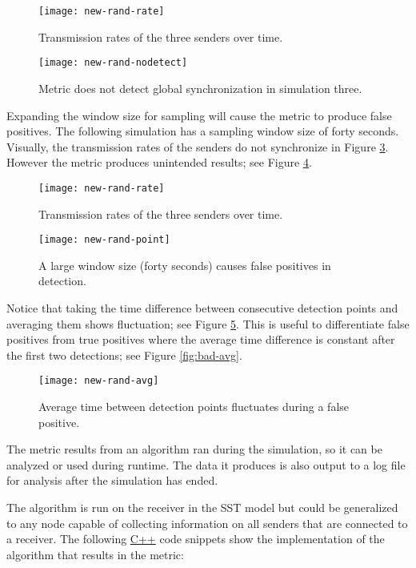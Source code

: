\documentclass{article}
\newcommand{\plotsize}{0.25}
\begin{document}
\begin{figure}[H]
	\centering
	\texttt{[image: new-rand-rate]}
	\caption{Transmission rates of the three senders over time.}
	\label{fig:rand-rate}
\end{figure}

\begin{figure}[H]
	\centering
	\texttt{[image: new-rand-nodetect]}
	\caption{Metric does not detect global synchronization in simulation three.}
	\label{fig:rand-metric}
\end{figure}

Expanding the window size for sampling will cause the metric to produce false positives. The following simulation has a sampling window size of forty seconds. Visually, the transmission rates of the senders do not synchronize in Figure \ref{fig:falpos-rate}. However the metric produces unintended results; see Figure \ref{fig:falpos-metric}.

\begin{figure}[H]
	\centering
	\texttt{[image: new-rand-rate]}
	\caption{Transmission rates of the three senders over time.}
	\label{fig:falpos-rate}
\end{figure}

\begin{figure}[H]
	\centering
	\texttt{[image: new-rand-point]}
	\caption{A large window size (forty seconds) causes false positives in detection.}
	\label{fig:falpos-metric}
\end{figure}

Notice that taking the time difference between consecutive detection points and averaging them shows fluctuation; see Figure \ref{fig:falpos-avg}. This is useful to differentiate false positives from true positives where the average time difference is constant after the first two detections; see Figure \ref{fig:bad-avg}.

\begin{figure}[H]
	\centering
	\texttt{[image: new-rand-avg]}
	\caption{Average time between detection points fluctuates during a false positive.}
	\label{fig:falpos-avg}
\end{figure}


The metric results from an algorithm ran during the simulation, so it can be analyzed or used during runtime. The data it produces is also output to a log file for analysis after the simulation has ended.

The algorithm is run on the receiver in the SST model but could be generalized to any node capable of collecting information on all senders that are connected to a receiver. The following \href{https://en.wikipedia.org/wiki/C%2B%2B}{C++} code snippets show the implementation of the algorithm that results in the metric:\newline
\end{document}
